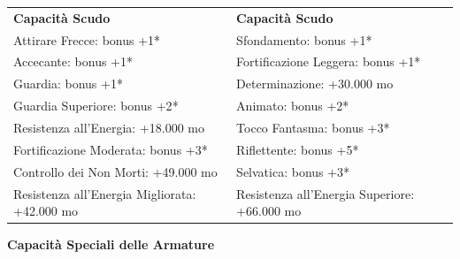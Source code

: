 \documentclass[a4paper,11pt,twoside,openany]{book}
\begin{document}
\begin{tabular}{ll}
	\toprule
	\textbf{Capacità Scudo}       & \textbf{Capacità Scudo}\\
	Attirare Frecce: bonus +1{*}  & Sfondamento: bonus +1{*}\\
	Accecante: bonus +1{*}        & Fortificazione Leggera: bonus +1{*}\\
	Guardia: bonus +1{*}          & Determinazione: +30.000 mo\\
	Guardia Superiore: bonus +2{*}& Animato: bonus +2{*}\\
	Resistenza all'Energia: +18.000 mo            & Tocco Fantasma: bonus +3{*}\\
	Fortificazione Moderata: bonus +3{*}          & Riflettente: bonus +5{*}\\
	Controllo dei Non Morti: +49.000 mo           & Selvatica: bonus +3{*}\\
	Resistenza all'Energia Migliorata: +42.000 mo & Resistenza all'Energia Superiore: +66.000 mo\\
\end{tabular}

\bigskip

\textbf{Capacità Speciali delle Armature}
\end{document}
